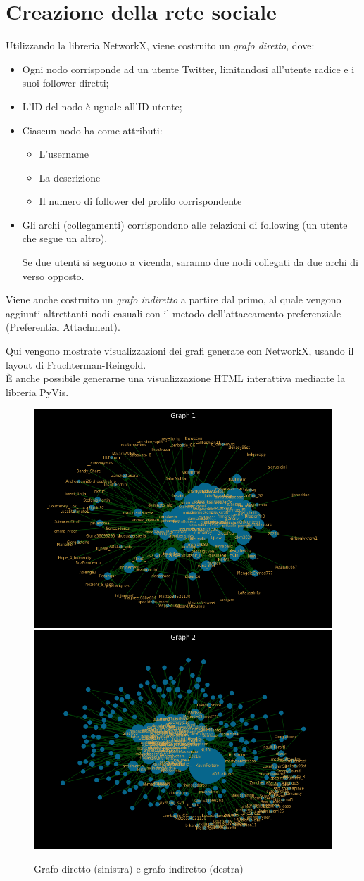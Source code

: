 \documentclass[a4paper, 11pt, twoside]{article}
\begin{document}
\section{Creazione della rete sociale}
Utilizzando la libreria NetworkX, viene costruito un \textit{grafo diretto}, dove:
\begin{itemize}
    \item Ogni nodo corrisponde ad un utente Twitter, limitandosi all'utente radice e i suoi follower diretti;
    \item L'ID del nodo è uguale all'ID utente;
    \item Ciascun nodo ha come attributi:
          \begin{itemize}
              \item L'username
              \item La descrizione
              \item Il numero di follower del profilo corrispondente
          \end{itemize}
    \item Gli archi (collegamenti) corrispondono alle relazioni di following (un utente che segue un altro).

          Se due utenti si seguono a vicenda, saranno due nodi collegati da due archi di verso opposto.
\end{itemize}

Viene anche costruito un \textit{grafo indiretto} a partire dal primo, al quale vengono aggiunti altrettanti nodi casuali con il metodo dell'attaccamento preferenziale (Preferential Attachment).

Qui vengono mostrate visualizzazioni dei grafi generate con NetworkX, usando il layout di Fruchterman-Reingold.\\
È anche possibile generarne una visualizzazione HTML interattiva mediante la libreria PyVis.

\begin{figure}[H]
    \centering
    \includegraphics[width=.45\textwidth, keepaspectratio]{directed_graph.png}
    \includegraphics[width=.45\textwidth, keepaspectratio]{non_directed_graph.png}

    Grafo diretto (sinistra) e grafo indiretto (destra)
\end{figure}
\end{document}
